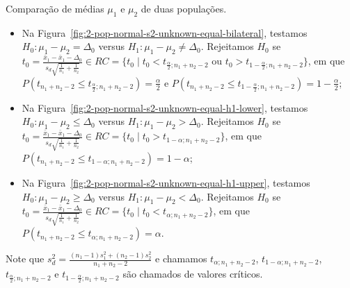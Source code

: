 \documentclass[9pt]{beamer}
\begin{document}
\begin{frame}{Comparação de médias $\mu_1$ e $\mu_2$ de duas populações.}

\begin{itemize}
	\item Na Figura~\ref{fig:2-pop-normal-s2-unknown-equal-bilateral}, testamos $H_0: \mu_1 - \mu_2 = \Delta_0$ versus $H_1: \mu_1 - \mu_2 \neq \Delta_0$. Rejeitamos $H_0$ se $t_0 = \frac{\bar{x}_1 - \bar{x}_1 - \Delta_0}{ s_d\sqrt{ \frac{1}{n_1} + \frac{1}{n_2} } } \in  RC=\{t_0 \mid t_0 < t_{\frac{\alpha}{2};n_1+n_2-2} \allowbreak \mbox{ ou } t_0 > t_{1-\frac{\alpha}{2};n_1+n_2-2} \}$, em que $P\left(t_{n_1+n_2-2} \leq t_{\frac{\alpha}{2}; n_1+n_2-2} \right) = \frac{\alpha}{2}$ e $P\left(t_{n_1+n_2-2} \leq t_{1-\frac{\alpha}{2}; n_1+n_2-2} \right) = 1 - \frac{\alpha}{2}$;
	\vfill
	
	\item Na Figura~\ref{fig:2-pop-normal-s2-unknown-equal-h1-lower}, testamos $H_0: \mu_1 - \mu_2 \leq \Delta_0 $ versus $H_1: \mu_1 - \mu_2 > \Delta_0$. Rejeitamos $H_0$ se $t_0 = \frac{\bar{x}_1 - \bar{x}_1 - \Delta_0}{ s_d\sqrt{ \frac{1}{n_1} + \frac{1}{n_2} } } \in \allowbreak RC=\{t_0 \mid t_0 > t_{1-\alpha; n_1+n_2-2}  \}$, em que $P\left(t_{n_1+n_2-2} \leq  t_{1-\alpha;n_1+n_2-2} \right) =1- \alpha$;
	\vfill
	
	\item Na Figura~\ref{fig:2-pop-normal-s2-unknown-equal-h1-upper}, testamos $H_0: \mu_1 - \mu_2 \geq \Delta_0$ versus $H_1: \mu_1 - \mu_2  < \Delta_0$. Rejeitamos $H_0$ se $t_0 = \frac{\bar{x}_1 - \bar{x}_1 - \Delta_0}{ s_d\sqrt{ \frac{1}{n_1} + \frac{1}{n_2} } } \in \allowbreak RC=\{t_0 \mid t_0 < t_{\alpha;n_1+n_2-2}  \}$, em que $P\left(t_{n_1+n_2-2} \leq t_{\alpha;n_1+n_2-2} \right) = \alpha$.
\end{itemize}
Note que $s_d^2 = \frac{(n_1-1) s_1^2 + (n_2-1) s_2^2}{n_1+n_2-2}$ e chamamos $t_{\alpha;n_1+n_2-2}$, $t_{1-\alpha;n_1+n_2-2}$, $t_{\frac{\alpha}{2};n_1+n_2-2}$ e $t_{1-\frac{\alpha}{2};n_1+n_2-2}$ são chamados de valores críticos.
\end{frame}
\end{document}
